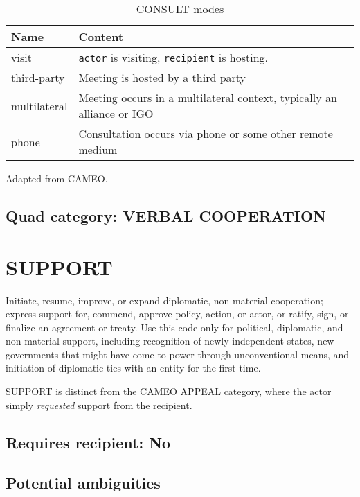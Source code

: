 \documentclass[11pt]{report}
\newcommand{\plcat}[1]{\textsf{#1}}
\newcommand{\txt}[1]{\texttt{#1}}
\begin{document}
\begin{table}[htp]
\caption{CONSULT modes}
\begin{center}
\begin{tabular}{|l|p{13cm}|}
\hline
Name & Content \\
\hline
visit & \txt{actor} is visiting, \txt{recipient} is hosting.\\
third-party & Meeting is hosted by a third party\\
multilateral & Meeting occurs in a multilateral context, typically an alliance or IGO\\
phone & Consultation occurs via phone or some other remote medium\\
\hline
\end{tabular}
\end{center}
\label{tab:consultmode}
Adapted from CAMEO.
\end{table}%

\subsection{Quad category: VERBAL COOPERATION}


\newpage

\section{SUPPORT}

Initiate, resume, improve, or expand diplomatic, non-material cooperation; express support for, commend, approve policy, action, or actor, or ratify, sign, or finalize an agreement or treaty. Use this code only for political, diplomatic, and non-material support, including recognition of newly independent states, new governments that might have come to power through unconventional means, and initiation of diplomatic ties with an entity for the first time. 

\plcat{SUPPORT} is distinct from the CAMEO \plcat{APPEAL} category, where the actor simply \textit{requested} support from the recipient.
 
\subsection{Requires recipient: No}

\subsection{Potential ambiguities}
\end{document}
